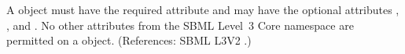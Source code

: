A \ModifierSpeciesReference object must have the required attribute
 and may have the optional attributes ,
,  and .  No other attributes from the
SBML Level~3 Core namespace are permitted on a \ModifierSpeciesReference
object.  (References: SBML L3V2 .)
